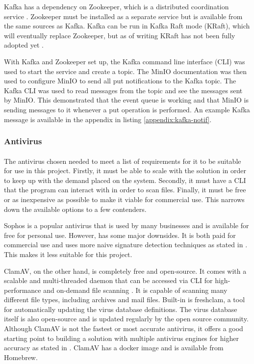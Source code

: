 \documentclass[12pt, conference, final, a4paper, onecolumn, compsoc]{IEEEtran}
\begin{document}
Kafka has a dependency on Zookeeper, which is a distributed coordination service
\citep{event-driven-arch}. Zookeeper must be installed as a separate service but
is available from the same sources as Kafka. Kafka can be run in Kafka Raft mode
(KRaft), which will eventually replace Zookeeper, but as of writing KRaft has
not been fully adopted yet \citep{kafka-raft}.

With Kafka and Zookeeper set up, the Kafka command line interface (CLI) was used
to start the service and create a topic. The MinIO documentation was then used
to configure MinIO to send all put notifications to the Kafka topic. The Kafka
CLI was used to read messages from the topic and see the messages sent by MinIO.
This demonstrated that the event queue is working and that MinIO is sending
messages to it whenever a put operation is performed. An example Kafka message
is available in the appendix in listing \ref{appendix:kafka-notif}.

\subsubsection*{Antivirus}
\paragraph{}

The antivirus chosen needed to meet a list of requirements for it to be suitable
for use in this project. Firstly, it must be able to scale with the solution in
order to keep up with the demand placed on the system. Secondly, it must have a
CLI that the program can interact with in order to scan files. Finally, it must
be free or as inexpensive as possible to make it viable for commercial use. This
narrows down the available options to a few contenders.

Sophos is a popular antivirus that is used by many businesses and is available
for free for personal use. However, has some major downsides. It is both paid
for commercial use and uses more naive signature detection techniques as stated
in \citep{sophos}. This makes it less suitable for this project.

ClamAV, on the other hand, is completely free and open-source. It comes with a
scalable and multi-threaded daemon that can be accessed via CLI for
high-performance and on-demand file scanning \citep{clamav}. It is capable of
scanning many different file types, including archives and mail files. Built-in
is freshclam, a tool for automatically updating the virus database definitions.
The virus database itself is also open-source and is updated regularly by the
open source community. Although ClamAV is not the fastest or most accurate
antivirus, it offers a good starting point to building a solution with multiple
antivirus engines for higher accuracy as stated in \citep{av-comparison}. ClamAV
has a docker image and is available from Homebrew.
\end{document}
